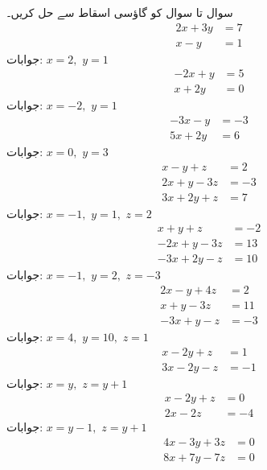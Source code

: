 سوال  تا سوال  کو گاؤسی اسقاط سے حل کریں۔
\quad
\begin{align*}
2x+3y&=7\\
x-y&=1
\end{align*}
جوابات:\quad
$x=2,\,\,y=1$
\quad
\begin{align*}
-2x+y&=5\\
x+2y&=0
\end{align*}
جوابات:\quad
$x=-2,\,\,y=1$
\quad
\begin{align*}
-3x-y&=-3\\
5x+2y&=6
\end{align*}
جوابات:\quad
$x=0,\,\,y=3$
\quad
\begin{align*}
x-y+z&=2\\
2x+y-3z&=-3\\
3x+2y+z&=7
\end{align*}
جوابات:\quad
$x=-1,\,\,y=1,\,\,z=2$
\quad
\begin{align*}
x+y+z&=-2\\
-2x+y-3z&=13\\
-3x+2y-z&=10
\end{align*}
جوابات:\quad
$x=-1,\,\,y=2,\,\,z=-3$
\quad
\begin{align*}
2x-y+4z&=2\\
x+y-3z&=11\\
-3x+y-z&=-3
\end{align*}
جوابات:\quad
$x=4,\,\,y=10,\,\,z=1$
\quad
\begin{align*}
x-2y+z&=1\\
3x-2y-z&=-1
\end{align*}
جوابات:\quad
$x=y,\,\,z=y+1$
\quad
\begin{align*}
x-2y+z&=0\\
2x-2z&=-4
\end{align*}
جوابات:\quad
$x=y-1,\,\,z=y+1$
\quad
\begin{align*}
4x-3y+3z&=0\\
8x+7y-7z&=0
\end{align*}
